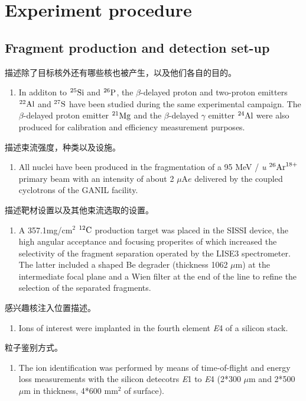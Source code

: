\documentclass[a4paper]{article}
\begin{document}
\section{Experiment procedure}
\subsection{Fragment production and detection set-up}

描述除了目标核外还有哪些核也被产生，以及他们各自的目的。
\begin{enumerate}
    \item In additon to $^{25}\textnormal{Si}$ and $^{26}\textnormal{P}$, the $\beta$-delayed proton and two-proton emitters $^{22}\textnormal{Al}$ and $^{27}\textnormal{S}$ have been studied during the same experimental campaign. The $\beta$-delayed proton emitter $^{21}\textnormal{Mg}$ and the $\beta$-delayed $\gamma$ emitter $^{24}\textnormal{Al}$ were also produced for calibration and efficiency measurement purposes.
\end{enumerate}

描述束流强度，种类以及设施。
\begin{enumerate}
    \item All nuclei have been produced in the fragmentation of a 95 MeV / \textit{u} $^{26}\textnormal{Ar}^{18+}$ primary beam with an intensity of about 2 $\mu$A$e$ delivered by the coupled cyclotrons of the GANIL facility.
\end{enumerate}

描述靶材设置以及其他束流选取的设置。
\begin{enumerate}
    \item A 357.1mg/cm$^{2}$ $^{12}\textnormal{C}$ production target was placed in the SISSI device, the high angular acceptance and focusing properites of which increased the selectivity of the fragment separation operated by the LISE3 spectrometer. The latter included a shaped Be degrader (thickness 1062 $\mu$m) at the intermediate focal plane and a Wien filter at the end of the line to refine the selection of the separated fragments.
\end{enumerate}

感兴趣核注入位置描述。
\begin{enumerate}
    \item Ions of interest were implanted in the fourth element \textit{E}4 of a silicon stack.
\end{enumerate}

粒子鉴别方式。
\begin{enumerate}
    \item The ion identification was performed by means of time-of-flight and energy loss measurements with the silicon detecotrs \textit{E}1 to \textit{E}4 (2*300 $\mu$m and 2*500 $\mu$m in thickness, 4*600 mm$^{2}$ of surface).
\end{enumerate}
\end{document}
